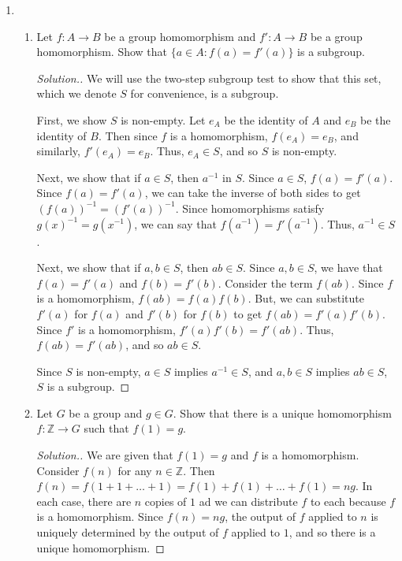 \documentclass{article}
\newcommand{\sk}{\smallskip}
\newcommand{\Z}{\mathbb{Z}}
\begin{document}
\begin{enumerate}
    \item \begin{enumerate}
        \item Let $f : A \rightarrow B$ be a group homomorphism and $f': A \rightarrow B$ be a group homomorphism. Show that $\{a \in A : f(a) = f'(a)\}$ is a subgroup.

        \begin{proof}[Solution.]
            We will use the two-step subgroup test to show that this set, which we denote $S$ for convenience, is a subgroup.

            \sk

            First, we show $S$ is non-empty. Let $e_A$ be the identity of $A$ and $e_B$ be the identity of $B$. Then since $f$ is a homomorphism, $f(e_A) = e_B$, and similarly, $f'(e_A) = e_B$. Thus, $e_A \in S$, and so $S$ is non-empty. 

            \sk

            Next, we show that if $a \in S$, then $a^{-1}$ in $S$. Since $a \in S$, $f(a) = f'(a)$. Since $f(a) = f'(a)$, we can take the inverse of both sides to get $(f(a))^{-1} = (f'(a))^{-1}$. Since homomorphisms satisfy $g(x)^{-1} = g(x^{-1})$, we can say that $f(a^{-1}) = f'(a^{-1})$. Thus, $a^{-1} \in S$. 

            \sk

            Next, we show that if $a, b \in S$, then $ab \in S$. Since $a, b \in S$, we have that $f(a) = f'(a)$ and $f(b) = f'(b)$. Consider the term $f(ab)$. Since $f$ is a homomorphism, $f(ab) = f(a)f(b)$. But, we can substitute $f'(a)$ for $f(a)$ and $f'(b)$ for $f(b)$ to get $f(ab) = f'(a)f'(b)$. Since $f'$ is a homomorphism, $f'(a)f'(b) = f'(ab)$. Thus, $f(ab) = f'(ab)$, and so $ab \in S$.
            
            \sk

            Since $S$ is non-empty, $a \in S$ implies $a^{-1} \in S$, and $a, b \in S$ implies $ab \in S$, $S$ is a subgroup.
        \end{proof}

        \item Let $G$ be a group and $g \in G$. Show that there is a unique homomorphism $f : \Z \rightarrow G$ such that $f(1) = g$.

        \begin{proof}[Solution.]

        We are given that $f(1) = g$ and $f$ is a homomorphism. Consider $f(n)$ for any $n \in \Z$. Then $f(n) = f(1 + 1 + \dots + 1) = f(1) + f(1) + \dots + f(1) = ng$. In each case, there are $n$ copies of $1$ ad we can distribute $f$ to each because $f$ is a homomorphism. Since $f(n) = ng$, the output of $f$ applied to $n$ is uniquely determined by the output of $f$ applied to $1$, and so there is a unique homomorphism. 


\end{proof}
\end{enumerate}
\end{enumerate}
\end{document}
